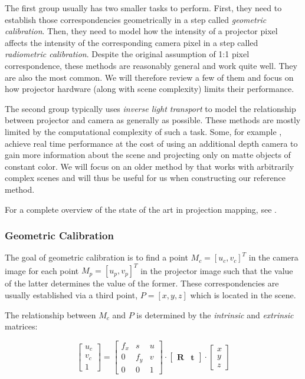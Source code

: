 The first group usually has two smaller tasks to perform. First, they need to establish those correspondencies geometrically in a step called \textit{geometric calibration}. Then, they need to model how the intensity of a projector pixel affects the intensity of the corresponding camera pixel in a step called \textit{radiometric calibration}. Despite the original assumption of 1:1 pixel correspondence, these methods are reasonably general and work quite well. They are also the most common. We will therefore review a few of them and focus on how projector hardware (along with scene complexity) limits their performance.

The second group typically uses \textit{inverse light transport} to model the relationship between projector and camera as generally as possible. These methods are mostly limited by the computational complexity of such a task. Some, for example \citet{Siegl2017}, achieve real time performance at the cost of using an additional depth camera to gain more information about the scene and projecting only on matte objects of constant color. We will focus on an older method by \citet{Wetzstein2007} that works with arbitrarily complex scenes and will thus be useful for us when constructing our reference method.

For a complete overview of the state of the art in projection mapping, see \citet{Grundhofer2018}.

\subsubsection{Geometric Calibration}
\label{section:background-projection_mapping-procams-geometric_calibration}

The goal of geometric calibration is to find a point \(M_c = [u_c, v_c]^T\) in the camera image for each point \(M_p = [u_p, v_p]^T\) in the projector image such that the value of the latter determines the value of the former. These correspondencies are usually established via a third point, \(P = [x, y, z]\) which is located in the scene.

The relationship between \(M_c\) and \(P\) is determined by the \textit{intrinsic} and \textit{extrinsic} matrices:

\begin{equation}
    \label{eq:camera_equation}
    \begin{bmatrix}
        u_c \\
        v_c \\
        1
    \end{bmatrix} =
    \begin{bmatrix}
        f_x & s & u \\
        0 & f_y & v \\
        0 & 0 & 1 
    \end{bmatrix} \cdot
    \begin{bmatrix}
        \mathbf{R} & \mathbf{t}
    \end{bmatrix} \cdot
    \begin{bmatrix}
        x \\
        y \\
        z
    \end{bmatrix}
\end{equation}

